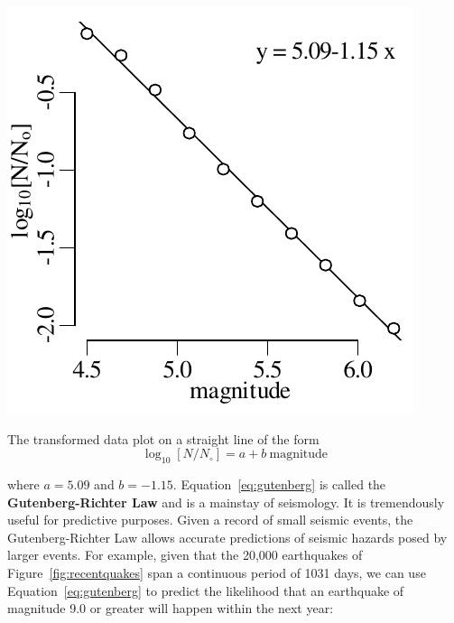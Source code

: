 \noindent\begin{minipage}[t][][b]{.3\textwidth}
  \includegraphics[width=\textwidth]{../figures/gutenberg.pdf}\\
\end{minipage}
\begin{minipage}[t][][t]{.7\textwidth}
  \label{fig:gutenberg}
\end{minipage}

The transformed data plot on a straight line of the form
\begin{equation}
  \log_{10}[N/N_\circ] = a + b~\mbox{magnitude}
  \label{eq:gutenberg}
\end{equation}

\noindent where $a = 5.09$ and $b =
-1.15$. Equation~\ref{eq:gutenberg} is called the
\textbf{Gutenberg-Richter Law} and is a mainstay of seismology. It is
tremendously useful for predictive purposes. Given a record of small
seismic events, the Gutenberg-Richter Law allows accurate predictions
of seismic hazards posed by larger events. For example, given that the
20,000 earthquakes of Figure~\ref{fig:recentquakes} span a continuous
period of 1031 days, we can use Equation~\ref{eq:gutenberg} to predict
the likelihood that an earthquake of magnitude 9.0 or greater will
happen within the next year:

